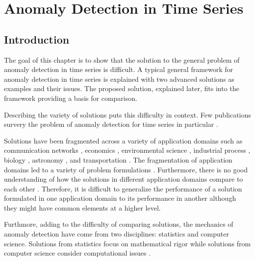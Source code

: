 \chapter[adts]{Anomaly Detection in Time Series}
\label{ch:ad}

\section[adintro]{Introduction}

The goal of this chapter is to show that the solution to the general problem of anomaly detection in time series is difficult. A typical general framework for anomaly detection in time series is explained with two advanced solutions as examples and their issues. The proposed solution, explained later, fits into the framework providing a basis for comparison.

Describing the variety of solutions puts this difficulty in context. Few publications survery the problem of anomaly detection for time series in particular \cite{Cheboli2010} \cite{Gupta2013}.

Solutions have been fragmented across a variety of application domains such as communication networks \cite{Jiang2006, Szymanski2004, Ye2000, Portnoy2001, Zhen2006, Warrender1999, Angiulli2007, Lane1999, Lane1997, Hofmeyr1998, Sequeira2002}, economics \cite{gupta2012community, Otey2006, Zhu2003}, environmental science \cite{Hill2010, Hill2010a, Angiulli2007, Birant2006, Cheng2006, Yuxiang2005, Wu2010, Drosdowsky1993, Lasaponara2006, Lu2004}, industrial process \cite{Basu2007, Nairac1999, Dasgupta1996, Bu2007}, biology \cite{Keogh2005, Wei2006}, astronomy \cite{Keogh2005, Yankov2008}, and transportation \cite{Li2009,Ge2010}. The fragmentation of application domains led to a variety of problem formulations \cite{Gupta2013}. Furthermore, there is no good understanding of how the solutions in different application domains compare to each other \cite{Cheboli2010}. Therefore, it is difficult to generalize the performance of a solution formulated in one application domain to its performance in another although they might have common elements at a higher level.

Furthmore, adding to the difficulty of comparing solutions, the mechanics of anomaly detection have come from two disciplines: statistics and computer science. Solutions from statistics focus on mathematical rigor while solutions from computer science consider computational issues \cite{Gupta2013}.

